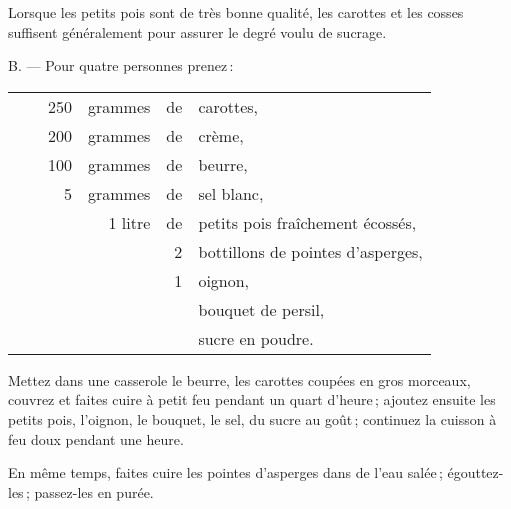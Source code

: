 Lorsque les petits pois sont de très bonne qualité, les carottes et les cosses
suffisent généralement pour assurer le degré voulu de sucrage.

\medskip

B. — Pour quatre personnes prenez :

\footnotesize
\begin{longtable}{rrrrrp{18em}}
  & \hspace{2em} & 250 & grammes & de & carottes,                                                         \\
  & \hspace{2em} & 200 & grammes & de & crème,                                                            \\
  & \hspace{2em} & 100 & grammes & de & beurre,                                                           \\
  & \hspace{2em} &   5 & grammes & de & sel blanc,                                                        \\
  & \hspace{2em} &     & 1 litre & de & petits pois fraîchement écossés,                                  \\
  & \hspace{2em} &     &         &  2 & bottillons de pointes d'asperges,                                 \\
  & \hspace{2em} &     &         &  1 & oignon,                                                           \\
  & \hspace{2em} &     &         &    & bouquet de persil,                                                \\
  & \hspace{2em} &     &         &    & sucre en poudre.                                                  \\
\end{longtable}
\normalsize

Mettez dans une casserole le beurre, les carottes coupées en gros morceaux,
couvrez et faites cuire à petit feu pendant un quart d'heure ; ajoutez ensuite
les petits pois, l'oignon, le bouquet, le sel, du sucre au goût ; continuez la
cuisson à feu doux pendant une heure.

En même temps, faites cuire les pointes d'asperges dans de l’eau salée ;
égouttez-les ; passez-les en purée.

